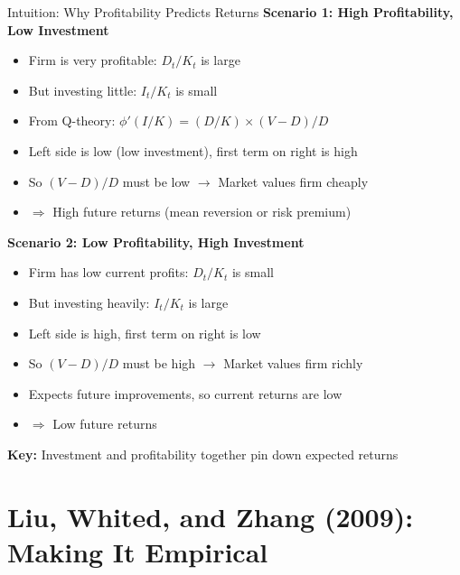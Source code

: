 \documentclass{beamer}
\begin{document}
\begin{frame}{Intuition: Why Profitability Predicts Returns}
    \textbf{Scenario 1: High Profitability, Low Investment}
    \begin{itemize}
        \item Firm is very profitable: $D_t/K_t$ is large
        \item But investing little: $I_t/K_t$ is small
        \item From Q-theory: $\phi'(I/K) = (D/K) \times (V-D)/D$
        \item Left side is low (low investment), first term on right is high
        \item So $(V-D)/D$ must be low $\rightarrow$ Market values firm cheaply
        \item $\Rightarrow$ High future returns (mean reversion or risk premium)
    \end{itemize}
    
    
    \textbf{Scenario 2: Low Profitability, High Investment}
    \begin{itemize}
        \item Firm has low current profits: $D_t/K_t$ is small
        \item But investing heavily: $I_t/K_t$ is large
        \item Left side is high, first term on right is low
        \item So $(V-D)/D$ must be high $\rightarrow$ Market values firm richly
        \item Expects future improvements, so current returns are low
        \item $\Rightarrow$ Low future returns
    \end{itemize}
    
    \vspace{0.2cm}
    \textbf{Key:} Investment and profitability together pin down expected returns
\end{frame}

\section{Liu, Whited, and Zhang (2009): Making It Empirical}
\end{document}
